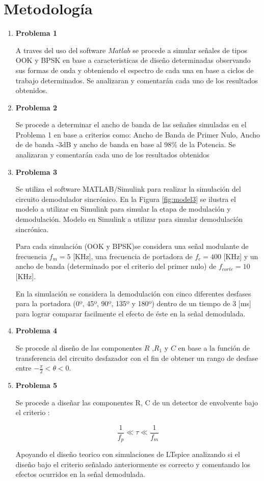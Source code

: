 \documentclass[letterpaper, titlepage]{article}
\begin{document}
\section{Metodología}
	\begin{enumerate}
		\item \textbf{Problema 1}
		
			A traves del uso del software $Matlab$ se procede a simular señales de tipos OOK y BPSK en base a caracteristicas de diseño determinadas observando sus formas de onda y obteniendo el espectro de cada una en base a ciclos de trabajo determinados. Se  analizaran y comentarán cada uno de  los resultados obtenidos.
		\item \textbf{Problema 2}
		
			Se procede a determinar el ancho de banda de las señañes simuladas en el Problema 1 en base a criterios como: Ancho de Banda de Primer Nulo, Ancho de de banda -3dB y ancho de banda en base al 98\% de la Potencia. Se  analizaran y comentarán cada uno de  los resultados obtenidos
		\item \textbf{Problema 3}
		
			Se utiliza el software MATLAB/Simulink para realizar la simulación del circuito demodulador sincrónico. En la Figura \ref{fig:model3} se ilustra el modelo a utilizar en Simulink para simular la etapa de modulación y demodulación.
			{Modelo en Simulink a utilizar para simular demodulación sincrónica.}
			
			Para cada simulación (OOK y BPSK)se considera una señal modulante de frecuencia $f_m=5$ [KHz], una frecuencia de portadora de $f_c=400$ [KHz] y un ancho de banda (determinado por el criterio del primer nulo) de $f_{corte}=10$ [KHz].
			
			En la simulación se considera la demodulación con cinco diferentes desfases para la portadora (0º, 45º, 90º, 135º y 180º) dentro de un tiempo de $3$ [ms] para lograr comparar facilmente el efecto de éste en la señal demodulada.
			
		\item \textbf{Problema 4}
		
			Se procede al diseño de las componentes $R$ ,$ R_1$ y $C$ en base a la función de transferencia del circuito desfazador con el fin de obtener  un rango de desfase entre $ -\frac{\pi}{2} <\theta< 0$.
		\item \textbf{Problema 5}
		
			Se procede a diseñar las componentes R, C de un detector de envolvente bajo el criterio :

			\begin{equation*}
			 \frac{1}{f_{p}} \ll \tau \ll \frac{1}{f_{m}}
			\end{equation*}

			Apoyando el diseño teorico con simulaciones de LTspice analizando si el diseño bajo el criterio señalado anteriormente es correcto y comentando los efectos ocurridos en la señal demodulada.
	\end{enumerate}
\newpage
\newpage
\end{document}
